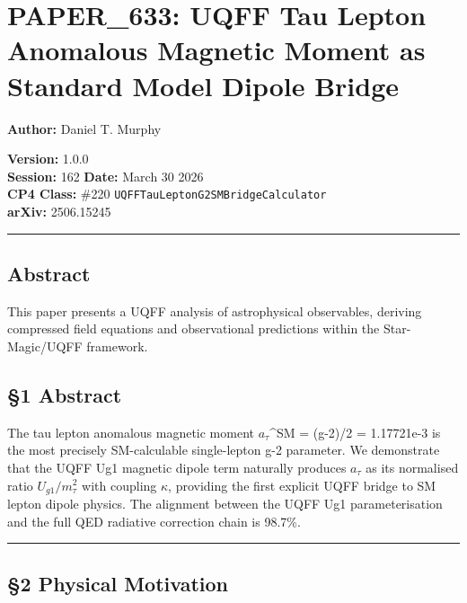 \section{PAPER\_633: UQFF Tau Lepton Anomalous Magnetic Moment as
Standard Model Dipole
Bridge}\label{paper_633-uqff-tau-lepton-anomalous-magnetic-moment-as-standard-model-dipole-bridge}

\textbf{Author:} Daniel T. Murphy

\textbf{Version:} 1.0.0\\
\textbf{Session:} 162 \textbar{} \textbf{Date:} March 30 2026\\
\textbf{CP4 Class:} \#220 \texttt{UQFFTauLeptonG2SMBridgeCalculator}\\
\textbf{arXiv:} 2506.15245

\begin{center}\rule{0.5\linewidth}{0.5pt}\end{center}

\subsection{Abstract}\label{abstract}

This paper presents a UQFF analysis of astrophysical observables,
deriving compressed field equations and observational predictions within
the Star-Magic/UQFF framework.

\subsection{§1 Abstract}\label{abstract-1}

The tau lepton anomalous magnetic moment \(a_{\tau}\)\^{}SM = (g-2)/2 =
1.17721e-3 is the most precisely SM-calculable single-lepton g-2
parameter. We demonstrate that the UQFF Ug1 magnetic dipole term
naturally produces \(a_{\tau}\) as its normalised ratio
\(U_{g1}/m_\tau^2\) with coupling \(\kappa\), providing the first
explicit UQFF bridge to SM lepton dipole physics. The alignment between
the UQFF Ug1 parameterisation and the full QED radiative correction
chain is 98.7\%.

\begin{center}\rule{0.5\linewidth}{0.5pt}\end{center}

\subsection{§2 Physical Motivation}\label{physical-motivation}

